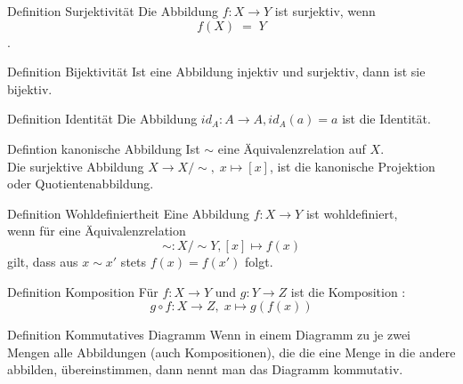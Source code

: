 \documentclass[a6paper,11pt,print,grid=front]{kartei}
\begin{document}
\begin{karte}{Definition Surjektivität}
    Die Abbildung \(f: X \rightarrow Y\) ist surjektiv, wenn \\
    \[ f(X) \; = \; Y\].
\end{karte} 
\begin{karte}{Definition Bijektivität}
    Ist eine Abbildung injektiv und surjektiv, dann ist sie bijektiv. 
\end{karte}
\begin{karte}{Definition Identität}
    Die Abbildung \(id_A : A \rightarrow A, id_A(a) = a\) ist die Identität.
\end{karte}
\begin{karte}{Defintion kanonische Abbildung}
    Ist \(\sim\) eine Äquivalenzrelation auf \(X\). \\
    Die surjektive Abbildung \(X \rightarrow X / \sim, \; x \mapsto [x]\), 
    ist die kanonische Projektion oder Quotientenabbildung. 
\end{karte}
\begin{karte}{Definition Wohldefiniertheit}
    Eine Abbildung \(f: X \rightarrow Y\) ist wohldefiniert, \\
    wenn für eine Äquivalenzrelation 
    \[\sim : X / \sim Y, [x] \mapsto f(x)\] 
    gilt, dass aus \(x \sim x\prime \) stets \(f(x) = f(x \prime)\) folgt. 
\end{karte}
\begin{karte}{Definition Komposition}
    Für \(f: X \rightarrow Y\) und \(g: Y \rightarrow Z\) ist 
    die Komposition :
    \[g \circ f : X \rightarrow Z,\; x \mapsto g(f(x))\]
\end{karte}
\begin{karte}{Definition Kommutatives Diagramm}
    Wenn in einem Diagramm zu je zwei Mengen alle Abbildungen 
    (auch Kompositionen), die die eine Menge in die andere abbilden,
    übereinstimmen, dann nennt man das Diagramm kommutativ. 
\end{karte}
\end{document}
